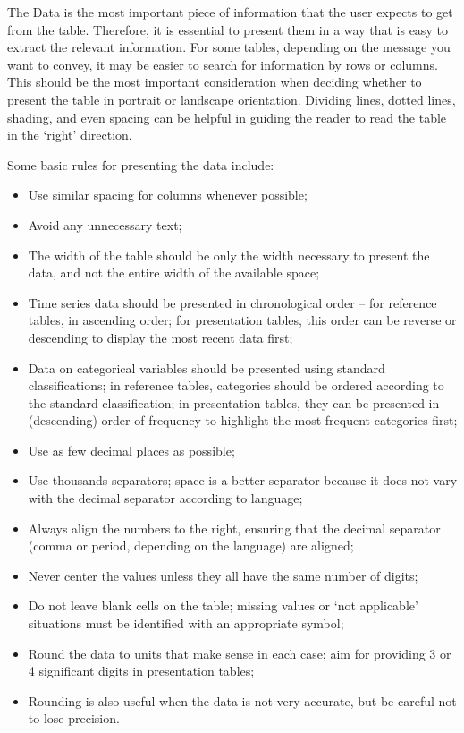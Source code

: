 \documentclass[
  12pt,
]{book}
\providecommand{\tightlist}{%
  \setlength{\itemsep}{0pt}\setlength{\parskip}{0pt}}
\begin{document}
The Data is the most important piece of information that the user expects to get from the table. Therefore, it is essential to present them in a way that is easy to extract the relevant information. For some tables, depending on the message you want to convey, it may be easier to search for information by rows or columns. This should be the most important consideration when deciding whether to present the table in portrait or landscape orientation. Dividing lines, dotted lines, shading, and even spacing can be helpful in guiding the reader to read the table in the `right' direction.

Some basic rules for presenting the data include:

\begin{itemize}
\tightlist
\item
  Use similar spacing for columns whenever possible;
\item
  Avoid any unnecessary text;
\item
  The width of the table should be only the width necessary to present the data, and not the entire width of the available space;
\item
  Time series data should be presented in chronological order -- for reference tables, in ascending order; for presentation tables, this order can be reverse or descending to display the most recent data first;
\item
  Data on categorical variables should be presented using standard classifications; in reference tables, categories should be ordered according to the standard classification; in presentation tables, they can be presented in (descending) order of frequency to highlight the most frequent categories first;
\item
  Use as few decimal places as possible;
\item
  Use thousands separators; space is a better separator because it does not vary with the decimal separator according to language;
\item
  Always align the numbers to the right, ensuring that the decimal separator (comma or period, depending on the language) are aligned;
\item
  Never center the values unless they all have the same number of digits;
\item
  Do not leave blank cells on the table; missing values or `not applicable' situations must be identified with an appropriate symbol;
\item
  Round the data to units that make sense in each case; aim for providing 3 or 4 significant digits in presentation tables;
\item
  Rounding is also useful when the data is not very accurate, but be careful not to lose precision.
\end{itemize}
\end{document}

